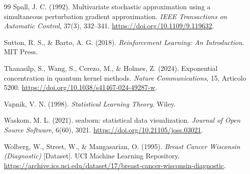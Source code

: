 \begin{thebibliography}{99}
Spall, J. C. (1992). Multivariate stochastic approximation using a simultaneous perturbation gradient approximation. \textit{IEEE Transactions on Automatic Control}, 37(3), 332--341. \url{https://doi.org/10.1109/9.119632}.

Sutton, R. S., \& Barto, A. G. (2018). \textit{Reinforcement Learning: An Introduction}. MIT Press.

Thanasilp, S., Wang, S., Cerezo, M., \& Holmes, Z. (2024). Exponential concentration in quantum kernel methods. \textit{Nature Communications}, 15, Articolo 5200. \url{https://doi.org/10.1038/s41467-024-49287-w}.

Vapnik, V. N. (1998). \textit{Statistical Learning Theory}. Wiley.

Waskom, M. L. (2021). seaborn: statistical data visualization. \textit{Journal of Open Source Software}, 6(60), 3021. \url{https://doi.org/10.21105/joss.03021}.

Wolberg, W., Street, W., \& Mangasarian, O. (1995). \textit{Breast Cancer Wisconsin (Diagnostic)} [Dataset]. UCI Machine Learning Repository. \url{https://archive.ics.uci.edu/dataset/17/breast-cancer-wisconsin-diagnostic}.

\end{thebibliography}
